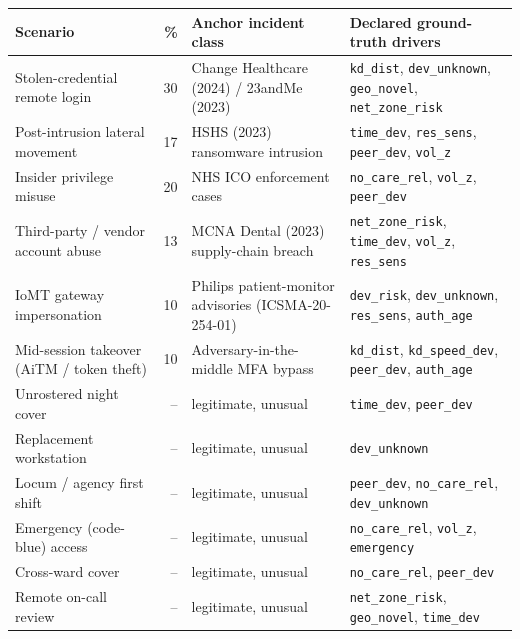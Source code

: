 \begin{tabular}{>{\raggedright\arraybackslash}p{2.7cm}r>{\raggedright\arraybackslash}p{3.2cm}>{\raggedright\arraybackslash}p{7.0cm}}
\toprule
Scenario & \% & Anchor incident class & Declared ground-truth drivers \\
\midrule
Stolen-credential remote login & 30 & Change Healthcare (2024) / 23andMe (2023) & \texttt{kd\_\allowbreak{}dist}, \texttt{dev\_\allowbreak{}unknown}, \texttt{geo\_\allowbreak{}novel}, \texttt{net\_\allowbreak{}zone\_\allowbreak{}risk} \\
Post-intrusion lateral movement & 17 & HSHS (2023) ransomware intrusion & \texttt{time\_\allowbreak{}dev}, \texttt{res\_\allowbreak{}sens}, \texttt{peer\_\allowbreak{}dev}, \texttt{vol\_\allowbreak{}z} \\
Insider privilege misuse & 20 & NHS ICO enforcement cases & \texttt{no\_\allowbreak{}care\_\allowbreak{}rel}, \texttt{vol\_\allowbreak{}z}, \texttt{peer\_\allowbreak{}dev} \\
Third-party / vendor account abuse & 13 & MCNA Dental (2023) supply-chain breach & \texttt{net\_\allowbreak{}zone\_\allowbreak{}risk}, \texttt{time\_\allowbreak{}dev}, \texttt{vol\_\allowbreak{}z}, \texttt{res\_\allowbreak{}sens} \\
IoMT gateway impersonation & 10 & Philips patient-monitor advisories (ICSMA-20-254-01) & \texttt{dev\_\allowbreak{}risk}, \texttt{dev\_\allowbreak{}unknown}, \texttt{res\_\allowbreak{}sens}, \texttt{auth\_\allowbreak{}age} \\
Mid-session takeover (AiTM / token theft) & 10 & Adversary-in-the-middle MFA bypass & \texttt{kd\_\allowbreak{}dist}, \texttt{kd\_\allowbreak{}speed\_\allowbreak{}dev}, \texttt{peer\_\allowbreak{}dev}, \texttt{auth\_\allowbreak{}age} \\
\midrule
Unrostered night cover & -- & legitimate, unusual & \texttt{time\_\allowbreak{}dev}, \texttt{peer\_\allowbreak{}dev} \\
Replacement workstation & -- & legitimate, unusual & \texttt{dev\_\allowbreak{}unknown} \\
Locum / agency first shift & -- & legitimate, unusual & \texttt{peer\_\allowbreak{}dev}, \texttt{no\_\allowbreak{}care\_\allowbreak{}rel}, \texttt{dev\_\allowbreak{}unknown} \\
Emergency (code-blue) access & -- & legitimate, unusual & \texttt{no\_\allowbreak{}care\_\allowbreak{}rel}, \texttt{vol\_\allowbreak{}z}, \texttt{emergency} \\
Cross-ward cover & -- & legitimate, unusual & \texttt{no\_\allowbreak{}care\_\allowbreak{}rel}, \texttt{peer\_\allowbreak{}dev} \\
Remote on-call review & -- & legitimate, unusual & \texttt{net\_\allowbreak{}zone\_\allowbreak{}risk}, \texttt{geo\_\allowbreak{}novel}, \texttt{time\_\allowbreak{}dev} \\
\bottomrule
\end{tabular}
